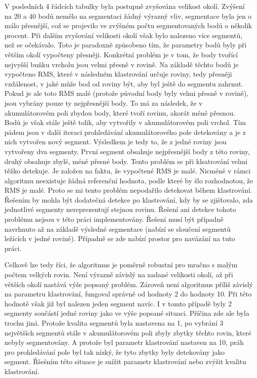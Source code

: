 \documentclass[11pt,twoside,a4paper]{book}
\begin{document}
V posledních 4 řádcích tabulky byla postupně zvyšována velikost okolí. Zvýšení na 20 a 40 bodů nemělo na segmentaci žádný výrazný vliv, segmentace byla jen o málo přesnější, což se projevilo ve zvýšném počtu segmentovaných bodů o několik procent. Při dalším zvyšování velikosti okolí však bylo nalezeno více segmentů, než se očekávalo. Toto je paradoxně způsobeno tím, že parametry bodů byly při větším okolí vypočteny přesněji. Konkrétní problém je v tom, že body tvořící nejvyšší buňku vrcholu jsou velmi přesně v rovině. Na základě těchto bodů je vypočteno RMS, které v následném klastrování určuje  roviny, tedy přesněji vzdálenost, v jaké může bod od roviny být, aby byl ještě do segmentu zahrnut. Pokud je ale toto RMS malé (protože původní body byly  velmi přesně v rovině), jsou vybrány pouze ty nejpřesnější body. To má za následek, že v akumulátorovém poli zbydou body, které tvoří rovinu, akorát méně přesnou. Bodů je však stále ještě tolik, aby vytvořily v akumulátorovém poli vrchol. Tím pádem jsou v další iteraci prohledávání akumulátorového pole detekovány a je z nich vytvořen nový segment. Výsledkem je tedy to, že z jedné roviny jsou vytvořeny dva segmenty. První segment obsahuje nejpřesnější body z této roviny, druhý obsahuje zbylé, méně přesné body. Tento problém se při klsatrování velmi těžko detekuje. Je založen na faktu, že vypočtené RMS je malé. Nicméně v rámci algoritmu neexistuje žádná referenční hodnota, podle které by šlo rozhodnotou, že RMS je malé. Proto se mi tento problém nepodařilo detekovat během klastrování. Řešením by mohla být dodatečná detekce po klastrování, kdy by se zjišťovalo, zda jednotlivé segmenty nereprezentují stejnou rovinu. Řešení ani detekce tohoto problému nejsou v této práci implementovány. Řešení musí být případně navrhnuto až na základě výsledné segmentace (nabízí se sloučení segmentů ležících v jedné rovině). Případně se zde nabízí prostor pro navázání na tuto práci.

Celkově lze tedy říci, že algoritmus je poměrně robustní pro mračno s malým počtem velkých rovin. Není výrazně závislý na zadané velikosti okolí, až při větších okolí nastává výše popsaný problém. Zároveň není algoritmus příliš závislý na parametru klastrování, fungoval správně od hodnoty 2 do hodnoty 10. Při této hodnotě však již byl nalezen jeden segment navíc. I v tomto případě byly 2 segmenty součástí jedné roviny jako ve výše popsané situaci. Příčina zde ale byla trochu jiná. Protože kvalita segmentů byla nastavena na 1, po vybrání 3 největších segmentů stále v akumulátorovém poli zbyly zbytky těchto rovin, které nebyly segmentovány. A protože byl parametr klastrování nastaven na 10, práh pro prohledávání pole byl tak nízký, že tyto zbytky byly detekovány jako segment. Řšešním této situace je snížit parametr klastrování nebo zvýšit kvalitu klastrování. 
\end{document}
